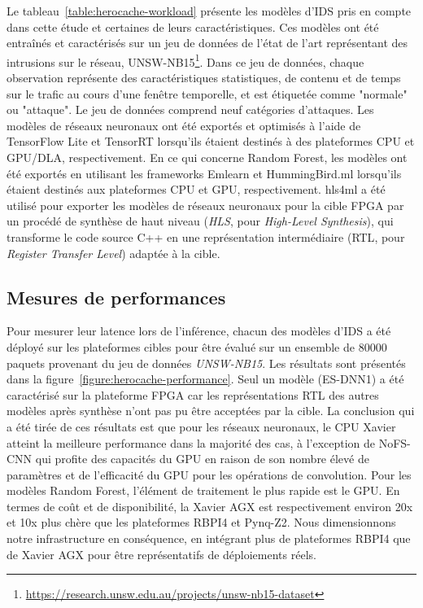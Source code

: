 {Le tableau~\ref{table:herocache-workload} présente les modèles d'IDS pris en compte dans cette étude et certaines de leurs caractéristiques. Ces modèles ont été entraînés et caractérisés sur un jeu de données de l'état de l'art représentant des intrusions sur le réseau, UNSW-NB15\footnote{\href{https://research.unsw.edu.au/projects/unsw-nb15-dataset}{https://research.unsw.edu.au/projects/unsw-nb15-dataset}}. Dans ce jeu de données, chaque observation représente des caractéristiques statistiques, de contenu et de temps sur le trafic au cours d'une fenêtre temporelle, et est étiquetée comme "normale" ou "attaque". Le jeu de données comprend neuf catégories d'attaques. Les modèles de réseaux neuronaux ont été exportés et optimisés à l'aide de TensorFlow Lite et TensorRT lorsqu'ils étaient destinés à des plateformes CPU et GPU/DLA, respectivement. En ce qui concerne Random Forest, les modèles ont été exportés en utilisant les frameworks Emlearn et HummingBird.ml lorsqu'ils étaient destinés aux plateformes CPU et GPU, respectivement. hls4ml a été utilisé pour exporter les modèles de réseaux neuronaux pour la cible FPGA par un procédé de synthèse de haut niveau (\textit{HLS}, pour \textit{High-Level Synthesis}), qui transforme le code source C++ en une représentation intermédiaire (\gls{RTL}, pour \textit{Register Transfer Level}) adaptée à la cible.

\subsection{Mesures de performances}

Pour mesurer leur latence lors de l'inférence, chacun des modèles d'IDS a été déployé sur les plateformes cibles pour être évalué sur un ensemble de $80 000$ paquets provenant du jeu de données \textit{UNSW-NB15}. Les résultats sont présentés dans la figure~\ref{figure:herocache-performance}. Seul un modèle (ES-DNN1) a été caractérisé sur la plateforme FPGA car les représentations RTL des autres modèles après synthèse n'ont pas pu être acceptées par la cible. La conclusion qui a été tirée de ces résultats est que pour les réseaux neuronaux, le CPU Xavier atteint la meilleure performance dans la majorité des cas, à l'exception de NoFS-CNN qui profite des capacités du GPU en raison de son nombre élevé de paramètres et de l'efficacité du GPU pour les opérations de convolution. Pour les modèles Random Forest, l'élément de traitement le plus rapide est le GPU. En termes de coût et de disponibilité, la Xavier AGX est respectivement environ 20x et 10x plus chère que les plateformes RBPI4 et Pynq-Z2. Nous dimensionnons notre infrastructure en conséquence, en intégrant plus de plateformes RBPI4 que de Xavier AGX pour être représentatifs de déploiements réels.

}
